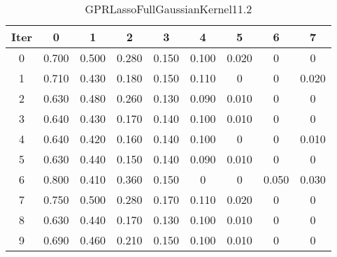\begin{table}
	\begin{center}
		\begin{tabular}{|c|c|c|c|c|c|c|c|c|}
			\hline
			Iter & 0 & 1 & 2 & 3 & 4 & 5 & 6 & 7 \\
			\hline
			0 & 0.700 & 0.500 & 0.280 & 0.150 & 0.100 & 0.020 & 0 & 0 \\
			\hline
			1 & 0.710 & 0.430 & 0.180 & 0.150 & 0.110 & 0 & 0 & 0.020 \\
			\hline
			2 & 0.630 & 0.480 & 0.260 & 0.130 & 0.090 & 0.010 & 0 & 0 \\
			\hline
			3 & 0.640 & 0.430 & 0.170 & 0.140 & 0.100 & 0.010 & 0 & 0 \\
			\hline
			4 & 0.640 & 0.420 & 0.160 & 0.140 & 0.100 & 0 & 0 & 0.010 \\
			\hline
			5 & 0.630 & 0.440 & 0.150 & 0.140 & 0.090 & 0.010 & 0 & 0 \\
			\hline
			6 & 0.800 & 0.410 & 0.360 & 0.150 & 0 & 0 & 0.050 & 0.030 \\
			\hline
			7 & 0.750 & 0.500 & 0.280 & 0.170 & 0.110 & 0.020 & 0 & 0 \\
			\hline
			8 & 0.630 & 0.440 & 0.170 & 0.130 & 0.100 & 0.010 & 0 & 0 \\
			\hline
			9 & 0.690 & 0.460 & 0.210 & 0.150 & 0.100 & 0.010 & 0 & 0 \\
			\hline
		\end{tabular}
	\end{center}
	\caption{GPRLassoFullGaussianKernel11.2}
\end{table}